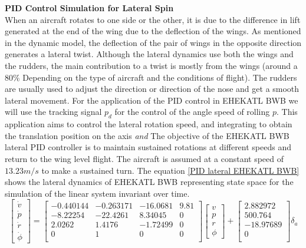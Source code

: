 \textbf{PID Control Simulation for Lateral Spin}\\
When an aircraft rotates to one side or the other, it is due to the difference in lift generated at the end of the wing due to the deflection of the wings. As mentioned in the dynamic model, the deflection of the pair of wings in the opposite direction generates a lateral twist. Although the lateral dynamics use both the wings and the rudders, the main contribution to a twist is mostly from the wings (around a $80\%$ Depending on the type of aircraft and the conditions of flight). The rudders are usually used to adjust the direction or direction of the nose and get a smooth lateral movement. For the application of the PID control in EHEKATL BWB we will use the tracking signal $p_d$ for the control of the angle speed of rolling $p$. This application aims to control the lateral rotation speed, and integrating to obtain the translation position on the axis \textit{and} The objective of the EHEKATL BWB lateral PID controller is to maintain sustained rotations at different speeds and return to the wing level flight. The aircraft is assumed at a constant speed of $13.23 m/s$ to make a sustained turn. The equation \ref{PID lateral EHEKATL BWB} shows the lateral dynamics of EHEKATL BWB representing state space for the simulation of the linear system invariant over time. 
\begin{equation}
\label{PID lateral EHEKATL BWB}
    \begin{bmatrix}
        \dot v \\
        \dot p \\
        \dot r \\
        \dot \phi
    \end{bmatrix}
    =
    \begin{bmatrix}
    -0.440144 & -0.263171 & -16.0681 & 9.81 \\
    -8.22254 & -22.4261 & 8.34045 & 0 \\
    2.0262 & 1.4176 &-1.72499 & 0 \\
    0 & 1 & 0 & 0 \\
    \end{bmatrix}
    \begin{bmatrix}
        v \\
        p \\
        r \\
        \phi
    \end{bmatrix}
    +
    \begin{bmatrix}
    2.882972 \\
    500.764 \\
    -18.97689 \\
    0\\
    \end{bmatrix}
    \delta_a
\end{equation}


